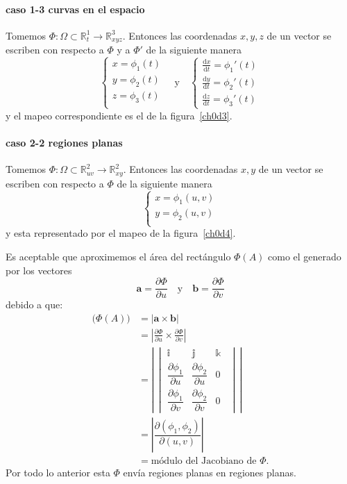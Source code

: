 \documentclass[mid,fleqn,draft,twoside]{notasdeclase}
\newcommand{\ve}[1]{\bm{#1}}
\renewcommand{\t}{\times}
\newcommand{\pdd}[2]{\dfrac{\partial #1}{\partial #2}}
\newcommand{\R}{\mathbb{R}}
\newcommand{\ihat}{\mathbb i}
\newcommand{\jhat}{\mathbb j}
\newcommand{\khat}{\mathbb k}
\begin{document}
  \paragraph{caso 1-3 curvas en el espacio} Tomemos $\Phi\colon\Omega\subset\R^1_t\to\R^3_{xyz}$. Entonces las coordenadas $x,y,z$ de un vector se escriben con respecto a $\Phi$ y a $\Phi'$ de la siguiente manera
%  
 \[ 
 \begin{cases}
 x = \phi_1(t) \\
 y = \phi_2(t) \\
 z = \phi_3(t) \\
 \end{cases} \quad\text{y}
 \quad\begin{cases}\displaystyle
 \frac{\mathrm dx}{\mathrm dt} = \phi_1'(t) \\[.8em] \displaystyle
 \frac{\mathrm dy}{\mathrm dt} = \phi_2'(t) \\[.8em] \displaystyle
 \frac{\mathrm dz}{\mathrm dt} = \phi_3'(t)
 \end{cases}
 \]
 y el mapeo correspondiente es el de la figura~\ref{ch0d3}.



\paragraph{caso 2-2 regiones planas} Tomemos $\Phi\colon\Omega\subset\R^2_{uv}\to\R^2_{xy}$. Entonces las coordenadas $x,y$ de un vector se escriben con respecto a $\Phi$ de la siguiente manera
%
\[ 
 \begin{cases}
x = \phi_1(u,v) \\
y = \phi_2(u,v) \\
\end{cases}
 \]
 y esta representado por el mapeo de la figura~\ref{ch0d4}.

Es aceptable que aproximemos el área del rectángulo $\Phi(A)$ como el generado por los vectores 
\[ \ve a = \frac{\partial\Phi}{\partial u}\quad\text{y}\quad\ve b=\frac{\partial\Phi}{\partial v} \]
debido a que:
 \begin{align*}
 	\big(\Phi(A)\big) &= \lvert\ve a\t\ve b\rvert \\
 				   &= \left\lvert \frac{\partial\Phi}{\partial u}\t\frac{\partial\Phi}{\partial v} \right\rvert \\
 				   &= \left\lvert\,
 				   		\begin{vmatrix}
 				   		\ihat& \jhat& \khat\phantom{0} \\[.3em]
 				   		\pdd{\phi_1}{u}& \pdd{\phi_2}{u}& 0\phantom{0} \\[.8em]
 				   		\pdd{\phi_1}{v}& \pdd{\phi_2}{v}& 0\phantom{0}
 				   		\end{vmatrix}\,
 				   	  \right\rvert \\
 				  &=\left\lvert \pdd{(\phi_1,\phi_2)}{(u,v)}\right\rvert \\
 				  &= \text{módulo del Jacobiano de $\Phi$.}
 \end{align*}
Por todo lo anterior esta $\Phi$ envía regiones planas en regiones planas.
\end{document}
